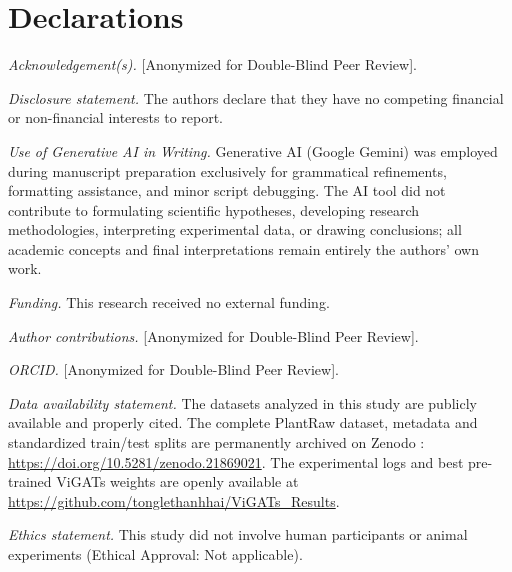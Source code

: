 \documentclass[]{interact}
\theoremstyle{plain}
\theoremstyle{definition}
\theoremstyle{remark}
\begin{document}
\section*{Declarations}

\textit{Acknowledgement(s).} [Anonymized for Double-Blind Peer Review].

\textit{Disclosure statement.} The authors declare that they have no competing financial or non-financial interests to report.

\textit{Use of Generative AI in Writing.} Generative AI (Google Gemini) was employed during manuscript preparation exclusively for grammatical refinements, formatting assistance, and minor script debugging. The AI tool did not contribute to formulating scientific hypotheses, developing research methodologies, interpreting experimental data, or drawing conclusions; all academic concepts and final interpretations remain entirely the authors' own work.

\textit{Funding.} This research received no external funding.

\textit{Author contributions.} [Anonymized for Double-Blind Peer Review].

\textit{ORCID.} [Anonymized for Double-Blind Peer Review].

\textit{Data availability statement.} The datasets analyzed in this study are publicly available and properly cited. The complete PlantRaw dataset, metadata and standardized train/test splits are permanently archived on Zenodo \citep{tongle2026plantraw}: \url{https://doi.org/10.5281/zenodo.21869021}. The experimental logs and best pre-trained ViGATs weights are openly available at \url{https://github.com/tonglethanhhai/ViGATs_Results}.

\textit{Ethics statement.} This study did not involve human participants or animal experiments (Ethical Approval: Not applicable).
\end{document}
